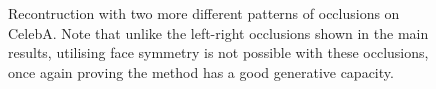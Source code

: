 \documentclass{article}
\begin{document}
\begin{figure}
    \centering
     \\
     \\
     \caption{Recontruction with two more different patterns of occlusions on CelebA. Note that unlike the left-right occlusions shown in the main results, utilising face symmetry is not possible with these occlusions, once again proving the method has a good generative capacity.}
    \label{fig:celeb_a_inpainting}
\end{figure}
\end{document}
